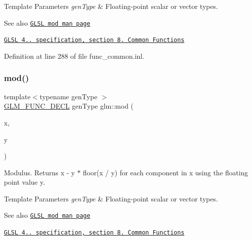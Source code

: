\begin{DoxyTemplParams}{Template Parameters}
{\em gen\+Type} & Floating-\/point scalar or vector types.\\
\hline
\end{DoxyTemplParams}
\begin{DoxySeeAlso}{See also}
\href{http://www.opengl.org/sdk/docs/manglsl/xhtml/mod.xml}{\tt G\+L\+SL mod man page} 

\href{http://www.opengl.org/registry/doc/GLSLangSpec.4.20.8.pdf}{\tt G\+L\+SL 4.. specification, section 8. Common Functions} 
\end{DoxySeeAlso}


Definition at line 288 of file func\+\_\+common.\+inl.

\mbox{\label{group__core__func__common_gad2127c78cb9e89ab462892b11417ded3}} 
\subsubsection{\texorpdfstring{mod()}{mod()}\hspace{0.1cm}{\footnotesize\ttfamily [2/2]}}
{\footnotesize\ttfamily template$<$typename gen\+Type $>$ \\
\hyperlink{setup_8hpp_ab2d052de21a70539923e9bcbf6e83a51}{G\+L\+M\+\_\+\+F\+U\+N\+C\+\_\+\+D\+E\+CL} gen\+Type glm\+::mod (\begin{DoxyParamCaption}\item[{gen\+Type const \&}]{x,  }\item[{typename gen\+Type\+::value\+\_\+type const \&}]{y }\end{DoxyParamCaption})}

Modulus. Returns x -\/ y $\ast$ floor(x / y) for each component in x using the floating point value y.


\begin{DoxyTemplParams}{Template Parameters}
{\em gen\+Type} & Floating-\/point scalar or vector types.\\
\hline
\end{DoxyTemplParams}
\begin{DoxySeeAlso}{See also}
\href{http://www.opengl.org/sdk/docs/manglsl/xhtml/mod.xml}{\tt G\+L\+SL mod man page} 

\href{http://www.opengl.org/registry/doc/GLSLangSpec.4.20.8.pdf}{\tt G\+L\+SL 4.. specification, section 8. Common Functions} 
\end{DoxySeeAlso}
\mbox{\label{group__core__func__common_gae47da02eb07d660201c09a0df7298a05}} 
